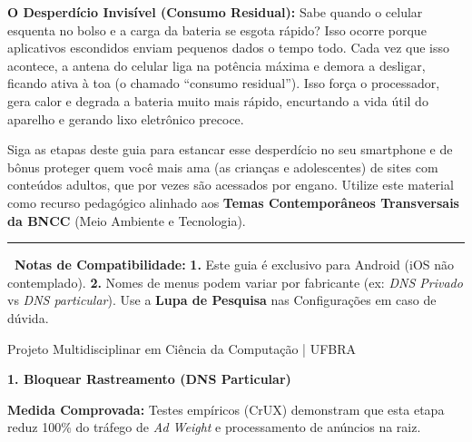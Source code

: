 \documentclass[11pt]{article}
\begin{document}
\vspace{1.5mm}

{\footnotesize \textbf{O Desperdício Invisível (Consumo Residual):} Sabe quando o celular esquenta no bolso e a carga da bateria se esgota rápido? Isso ocorre porque aplicativos escondidos enviam pequenos dados o tempo todo. Cada vez que isso acontece, a antena do celular liga na potência máxima e demora a desligar, ficando ativa à toa (o chamado ``consumo residual''). Isso força o processador, gera calor e degrada a bateria muito mais rápido, encurtando a vida útil do aparelho e gerando lixo eletrônico precoce.}

\vspace{1.5mm}

{\footnotesize Siga as etapas deste guia para estancar esse desperdício no seu smartphone e de bônus proteger quem você mais ama (as crianças e adolescentes) de sites com conteúdos adultos, que por vezes são acessados por engano. Utilize este material como recurso pedagógico alinhado aos \textbf{Temas Contemporâneos Transversais da BNCC} (Meio Ambiente e Tecnologia).}

\vspace{2mm}
\hrule
\vspace{1.5mm}

{\scriptsize
\textbf{\textcolor{BraveOrange}{\faInfoCircle \ Notas de Compatibilidade:}} \textbf{1.} Este guia é exclusivo para Android (iOS não contemplado). \textbf{2.} Nomes de menus podem variar por fabricante (ex: \textit{DNS Privado} vs \textit{DNS particular}). Use a \textbf{Lupa de Pesquisa} nas Configurações em caso de dúvida.}

\vfill
\begin{center}
    \tiny{\textcolor{NordText!50}{Projeto Multidisciplinar em Ciência da Computação | UFBRA}}
\end{center}

\newpage

\label{sec:dns}
\large{\textbf{\textcolor{AdguardGreen}{1. Bloquear Rastreamento (DNS Particular)}}}
\normalsize

\begin{tcolorbox}[colback=NordBg, coltext=NordText, colframe=AdguardGreen, boxrule=0.5pt, arc=2pt, left=1mm, right=1mm, top=1mm, bottom=1mm]
    \scriptsize \textbf{Medida Comprovada:} Testes empíricos (CrUX) demonstram que esta etapa reduz 100\% do tráfego de \textit{Ad Weight} e processamento de anúncios na raiz.
\end{tcolorbox}
\end{document}
